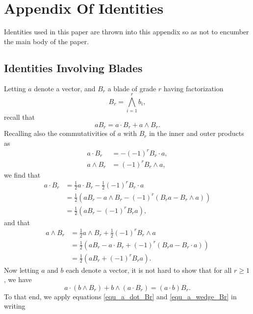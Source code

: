 \documentclass{birkjour}
\theoremstyle{definition}
\theoremstyle{remark}
\numberwithin{equation}{section}
\begin{document}
\section{Appendix Of Identities}\label{sec_identities_appendix}

Identities used in this paper are thrown into this appendix so as not to encumber the main body of the paper.

\subsection{Identities Involving Blades}

Letting $a$ denote a vector, and $B_r$ a blade of grade $r$ having factorization
\begin{equation}\label{equ_B_r}
B_r = \bigwedge_{i=1}^r b_i,
\end{equation}
recall that
\begin{equation}\label{equ_aBr_is_a_dot_Br_and_a_wedge_Br}
aB_r = a\cdot B_r + a\wedge B_r.
\end{equation}
Recalling also the commutativities of $a$ with $B_r$ in the inner and outer products as
\begin{align}
a\cdot B_r &= -(-1)^r B_r\cdot a,\label{equ_a_dot_Br_commutativity} \\
a\wedge B_r &= (-1)^r B_r\wedge a,\label{equ_a_wedge_Br_commutativity}
\end{align}
we find that
\begin{align}
a\cdot B_r &= \frac{1}{2}a\cdot B_r - \frac{1}{2}(-1)^r B_r\cdot a\nonumber \\
 &= \frac{1}{2}(aB_r - a\wedge B_r - (-1)^r(B_ra - B_r\wedge a))\nonumber \\
 &= \frac{1}{2}(aB_r-(-1)^rB_ra),\label{equ_a_dot_Br}
\end{align}
and that
\begin{align}
a\wedge B_r &= \frac{1}{2}a\wedge B_r + \frac{1}{2}(-1)^r B_r\wedge a\nonumber \\
 &= \frac{1}{2}(aB_r - a\cdot B_r + (-1)^r(B_ra - B_r\cdot a))\nonumber \\
 &= \frac{1}{2}(aB_r+(-1)^rB_ra).\label{equ_a_wedge_Br}
\end{align}
Now letting $a$ and $b$ each denote a vector, it is not hard to show that for all $r\geq 1$, we have
\begin{equation}\label{equ_a_dot_b_wedge_Br_identity}
a\cdot(b\wedge B_r) + b\wedge(a\cdot B_r) = (a\cdot b)B_r.
\end{equation}
To that end, we apply equations \eqref{equ_a_dot_Br} and \eqref{equ_a_wedge_Br} in writing
\end{document}
